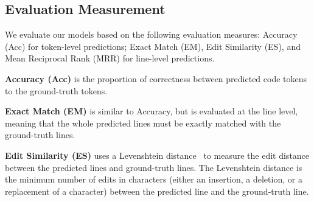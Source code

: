 \subsection{Evaluation Measurement}
We evaluate our models based on the following evaluation measures: Accuracy (Acc) for token-level predictions; Exact Match (EM), Edit Similarity (ES), and Mean Reciprocal Rank (MRR) for line-level predictions.





\textbf{Accuracy (Acc)} is the proportion of correctness between predicted code tokens to the ground-truth tokens. 


\textbf{Exact Match (EM)} is similar to  Accuracy, but is evaluated at the line level, meaning that the whole predicted lines must be exactly matched with the ground-truth lines. 


\textbf{Edit Similarity (ES)} uses a  Levenshtein distance~\cite{1966SPhD...10..707L} to measure the edit distance between the predicted lines and ground-truth lines. 
The Levenshtein distance is the minimum number of edits in characters (either an insertion, a deletion, or a replacement of a character) between the predicted line and the ground-truth line. 

